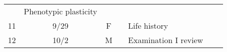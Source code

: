 \documentclass[]{article}
\begin{document}
\begin{longtable}[]{@{}cccllll@{}}
\begin{minipage}[t]{0.10\columnwidth}
\strut
\end{minipage} & \begin{minipage}[t]{0.11\columnwidth}\raggedright\strut
Phenotypic plasticity\strut
\end{minipage} & \begin{minipage}[t]{0.11\columnwidth}\raggedright\strut
\strut
\end{minipage} & \begin{minipage}[t]{0.16\columnwidth}\raggedright\strut
\strut
\end{minipage}\tabularnewline
\begin{minipage}[t]{0.12\columnwidth}\centering\strut
11\strut
\end{minipage} & \begin{minipage}[t]{0.08\columnwidth}\centering\strut
9/29\strut
\end{minipage} & \begin{minipage}[t]{0.07\columnwidth}\centering\strut
F\strut
\end{minipage} & \begin{minipage}[t]{0.10\columnwidth}\raggedright\strut
\strut
\end{minipage} & \begin{minipage}[t]{0.11\columnwidth}\raggedright\strut
Life history\strut
\end{minipage} & \begin{minipage}[t]{0.11\columnwidth}\raggedright\strut
\strut
\end{minipage} & \begin{minipage}[t]{0.16\columnwidth}\raggedright\strut
\strut
\end{minipage}\tabularnewline
\begin{minipage}[t]{0.12\columnwidth}\centering\strut
12\strut
\end{minipage} & \begin{minipage}[t]{0.08\columnwidth}\centering\strut
10/2\strut
\end{minipage} & \begin{minipage}[t]{0.07\columnwidth}\centering\strut
M\strut
\end{minipage} & \begin{minipage}[t]{0.10\columnwidth}\raggedright\strut
\strut
\end{minipage} & \begin{minipage}[t]{0.11\columnwidth}\raggedright\strut
Examination I review\strut
\end{minipage} & \begin{minipage}[t]{0.11\columnwidth}\raggedright\strut

\end{minipage}
\end{longtable}
\end{document}
